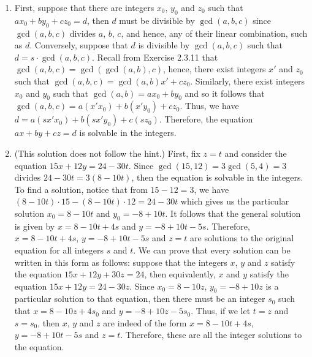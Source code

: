 \begin{solution}
    \begin{enumerate}
        \item First, suppose that there are integers $x_0$, $y_0$ and $z_0$ such that $ax_0 + by_0 + cz_0 = d$, then $d$ must be divisible by $\gcd(a,b,c)$ since $\gcd(a,b,c)$ divides $a$, $b$, $c$, and hence, any of their linear combination, such as $d$. Conversely, suppose that $d$ is divisible by $\gcd(a,b,c)$ such that $d = s\cdot \gcd(a,b,c)$. Recall from Exercise 2.3.11 that $\gcd(a,b,c) = \gcd(\gcd(a,b), c)$, hence, there exist integers $x'$ and $z_0$ such that $\gcd(a,b,c) = \gcd(a,b)x' + cz_0$. Similarly, there exist integers $x_0$ and $y_0$ such that $\gcd(a,b) = ax_0 + by_0$ and so it follows that $\gcd(a,b,c) = a(x'x_0) + b(x'y_0) + cz_0$. Thus, we have $d = a(sx'x_0) + b(sx'y_0) + c(sz_0)$. Therefore, the equation $ax + by + cz = d$ is solvable in the integers.
        \item (This solution does not follow the hint.) First, fix $z = t$ and consider the equation $15x + 12y = 24 - 30t$. Since $\gcd(15, 12) = 3\gcd(5, 4) = 3$ divides $24 - 30t = 3(8 - 10t)$, then the equation is solvable in the integers. To find a solution, notice that from $15 - 12 = 3$, we have $(8-10t)\cdot 15 - (8-10t)\cdot 12 = 24 - 30t$ which gives us the particular solution $x_0 = 8 - 10t$ and $y_0 = -8 + 10t$. It follows that the general solution is given by $x = 8 - 10t + 4s$ and $y = -8 + 10t - 5s$. Therefore, $x = 8 - 10t + 4s$, $y = -8 + 10t - 5s$ and $z = t$ are solutions to the original equation for all integers $s$ and $t$. We can prove that every solution can be written in this form as follows: suppose that the integers $x$, $y$ and $z$ satisfy the equation $15x + 12y + 30z = 24$, then equivalently, $x$ and $y$ satisfy the equation $15x + 12y = 24 - 30z$. Since $x_0 = 8 - 10z$, $y_0 = -8 + 10z$ is a particular solution to that equation, then there must be an integer $s_0$ such that $x = 8 - 10z + 4s_0$ and $y = -8 + 10z - 5s_0$. Thus, if we let $t = z$ and $s = s_0$, then $x$, $y$ and $z$ are indeed of the form $x = 8 - 10t + 4s$, $y = -8 + 10t - 5s$ and $z = t$. Therefore, these are all the integer solutions to the equation.
    \end{enumerate}
\end{solution}

